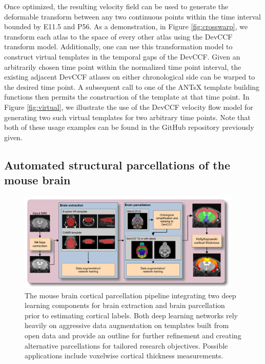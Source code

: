 \documentclass[
  12pt,
]{article}
\begin{document}
Once optimized, the resulting velocity field can be used to generate the
deformable transform between any two continuous points within the time
interval bounded by E11.5 and P56. As a demonstration, in Figure
\ref{fig:crosswarp}, we transform each atlas to the space of every other
atlas using the DevCCF transform model. Additionally, one can use this
transformation model to construct virtual templates in the temporal gaps
of the DevCCF. Given an arbitrarily chosen time point within the
normalized time point interval, the existing adjacent DevCCF atlases on
either chronological side can be warped to the desired time point. A
subsequent call to one of the ANTsX template building functions then
permits the construction of the template at that time point. In Figure
\ref{fig:virtual}, we illustrate the use of the DevCCF velocity flow
model for generating two such virtual templates for two arbitrary time
points. Note that both of these usage examples can be found in the
GitHub repository previously given.

\subsection{Automated structural parcellations of the mouse
brain}\label{automated-structural-parcellations-of-the-mouse-brain-1}

\begin{figure}
\centering
\includegraphics[width=0.95\textwidth]{Figures/mousePipeline.pdf}
\caption{The mouse brain cortical parcellation pipeline integrating two deep
learning components for brain extraction and brain parcellation prior to
estimating cortical labels. Both deep learning networks rely heavily on
aggressive data augmentation on templates built from open data and provide an
outline for further refinement and creating alternative parcellations for
tailored research objectives.  Possible applications include
voxelwise cortical thickness measurements.}
\label{fig:mouseKK}
\end{figure}
\end{document}
